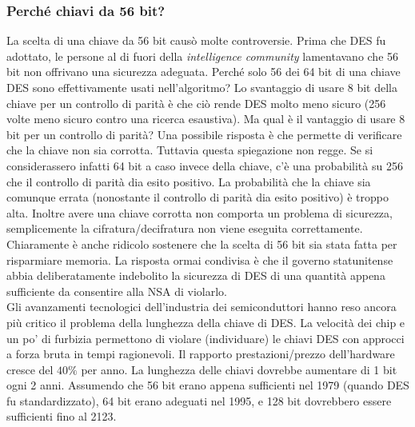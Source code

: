 \subsubsection{Perché chiavi da 56 bit?}
La scelta di una chiave da 56 bit causò molte controversie. Prima che DES fu adottato, le persone al di fuori della \textit{intelligence community} lamentavano che 56 bit non offrivano una sicurezza adeguata. Perché solo 56 dei 64 bit di una chiave DES sono effettivamente usati nell'algoritmo? Lo svantaggio di usare 8 bit della chiave per un controllo di parità è che ciò rende DES molto meno sicuro (256 volte meno sicuro contro una ricerca esaustiva). Ma qual è il vantaggio di usare 8 bit per un controllo di parità? Una possibile risposta è che permette di verificare che la chiave non sia corrotta. Tuttavia questa spiegazione non regge. Se si considerassero infatti 64 bit a caso invece della chiave, c'è una probabilità su 256 che il controllo di parità dia esito positivo. La probabilità che la chiave sia comunque errata (nonostante il controllo di parità dia esito positivo) è troppo alta. Inoltre avere una chiave corrotta non comporta un problema di sicurezza, semplicemente la cifratura/decifratura non viene eseguita correttamente. Chiaramente è anche ridicolo sostenere che la scelta di 56 bit sia stata fatta per risparmiare memoria. \newline La risposta ormai condivisa è che il governo statunitense abbia deliberatamente indebolito la sicurezza di DES di una quantità appena sufficiente da consentire alla NSA di violarlo. \\

Gli avanzamenti tecnologici dell'industria dei semiconduttori hanno reso ancora più critico il problema della lunghezza della chiave di DES. La velocità dei chip e un po' di furbizia permettono di violare (individuare) le chiavi DES con approcci a forza bruta in tempi ragionevoli. Il rapporto prestazioni/prezzo dell'hardware cresce del
$40\%$ per anno. La lunghezza delle chiavi dovrebbe aumentare di 1 bit ogni 2 anni. Assumendo che 56 bit erano appena sufficienti nel 1979 (quando DES fu standardizzato), 64 bit erano adeguati nel 1995, e 128 bit dovrebbero essere sufficienti fino al 2123. \newline

